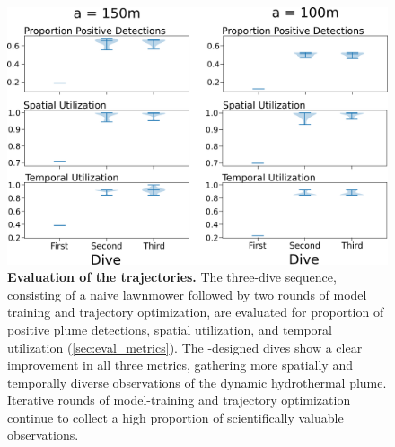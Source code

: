 \begin{figure}[h!]
    \centering
    \includegraphics[width=0.75\columnwidth]{figures/sim_traj_performance.png}
    \caption[Evaluation of the \PHORTEX trajectories]{\textbf{Evaluation of the \PHORTEX trajectories.} The three-dive sequence, consisting of a naive lawnmower followed by two rounds of \PHUMES model training and \PHORTEX trajectory optimization, are evaluated for proportion of positive plume detections, spatial utilization, and temporal utilization (\cref{sec:eval_metrics}). The \PHORTEX-designed dives show a clear improvement in all three metrics, gathering more spatially and temporally diverse observations of the dynamic hydrothermal plume. Iterative rounds of \PHORTEX model-training and trajectory optimization continue to collect a high proportion of scientifically valuable observations.}
    \label{fig:sim_traj_perform}
\end{figure}


